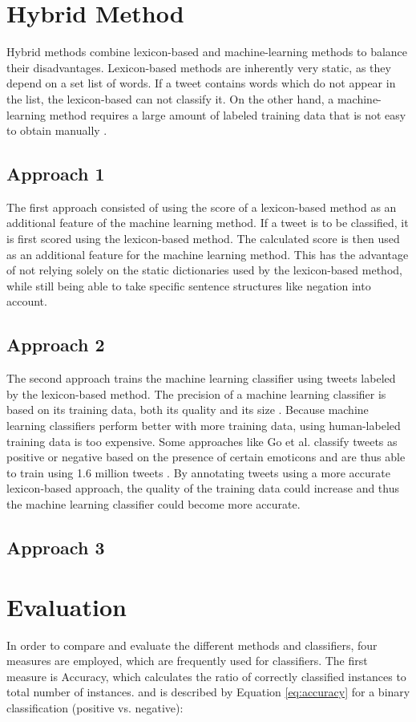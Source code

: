 \section{Hybrid Method}
Hybrid methods combine lexicon-based and machine-learning methods to balance their disadvantages. Lexicon-based methods are inherently very static, as they depend on a set list of words. If a tweet contains words which do not appear in the list, the lexicon-based can not classify it. On the other hand, a machine-learning method requires a large amount of labeled training data that is not easy to obtain manually \cite{DBLP:journals/csur/GiachanouC16}.

\subsection{Approach 1}
The first approach consisted of using the score of a lexicon-based method as an additional feature of the machine learning method. If a tweet is to be classified, it is first scored using the lexicon-based method. The calculated score is then used as an additional feature for the machine learning method. This has the advantage of not relying solely on the static dictionaries used by the lexicon-based method, while still being able to take specific sentence structures like negation into account.
\subsection{Approach 2}
The second approach trains the machine learning classifier using tweets labeled by the lexicon-based method. The precision of a machine learning classifier is based on its training data, both its quality and its size \cite{DBLP:journals/csur/GiachanouC16}. Because machine learning classifiers perform better with more training data, using human-labeled training data is too expensive. Some approaches like Go et al. classify tweets as positive or negative based on the presence of certain emoticons and are thus able to train using 1.6 million tweets \cite{GoBHaHua2009}. By annotating tweets using a more accurate lexicon-based approach, the quality of the training data could increase and thus the machine learning classifier could become more accurate.
\subsection{Approach 3}


\section{Evaluation}
In order to compare and evaluate the different methods and classifiers, four measures are employed, which are frequently used for classifiers. The first measure is Accuracy, which calculates the ratio of correctly classified instances to total number of instances. and is described by Equation \eqref{eq:accuracy} for a binary classification (positive vs. negative):

